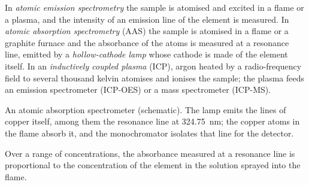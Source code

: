\begin{definition}\label{def:b2:mass-spec-atomic:atomic}
In \emph{atomic emission spectrometry} the sample is atomised and
excited in a flame or a plasma, and the intensity of an emission line of the element is measured. In
\emph{atomic absorption spectrometry} (AAS) the sample is
atomised in a flame or a graphite furnace and the absorbance of the atoms is measured at a resonance
line, emitted by a \emph{hollow-cathode lamp} whose cathode is made of the
element itself. In an \emph{inductively coupled plasma} (ICP), argon
heated by a radio-frequency field to several thousand kelvin atomises and ionises the sample; the
plasma feeds an emission spectrometer (ICP-OES) or a mass spectrometer (ICP-MS).
\end{definition}

\begin{omfigure}
\par\vspace{4pt}

{\small An atomic absorption spectrometer (schematic). The lamp emits the lines of copper itself, among
them the resonance line at \qty{324.75}{nm}; the copper atoms in the flame absorb it, and the
monochromator isolates that line for the detector.}
\end{omfigure}

\begin{proposition}\label{prop:b2:mass-spec-atomic:aas}
Over a range of concentrations, the absorbance measured at a resonance line is proportional to the
concentration of the element in the solution sprayed into the flame.
\end{proposition}

